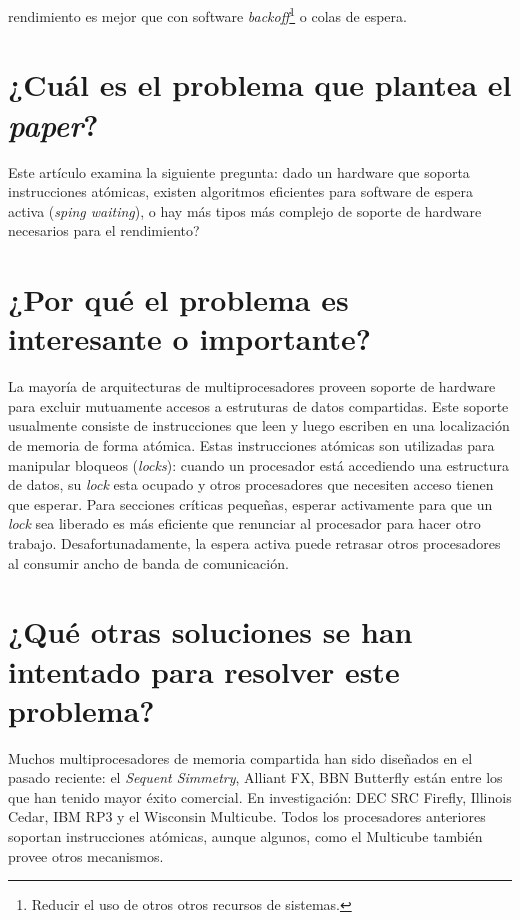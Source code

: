 rendimiento es mejor que con software \textit{backoff}\footnote{Reducir el uso de otros otros recursos de sistemas.} o colas de espera.  

\section{¿Cuál es el problema que plantea el \textit{paper}?}
Este artículo examina la siguiente pregunta: dado un hardware que soporta instrucciones atómicas, existen algoritmos eficientes para software de espera activa (\textit{sping waiting}), o hay más tipos más complejo de soporte de hardware necesarios para el rendimiento? 

\section{¿Por qué el problema es interesante o importante?}
La mayoría de arquitecturas de multiprocesadores proveen soporte de hardware para excluir mutuamente accesos a estruturas de datos compartidas. Este soporte usualmente consiste de instrucciones que leen y luego escriben en una localización de memoria de forma atómica. Estas instrucciones atómicas son utilizadas para manipular bloqueos (\textit{locks}): cuando un procesador está accediendo una estructura de datos, su \textit{lock} esta ocupado y otros procesadores que necesiten acceso tienen que esperar. Para secciones críticas pequeñas, esperar activamente para que un \textit{lock} sea liberado es más eficiente que renunciar al procesador para hacer otro trabajo. Desafortunadamente, la espera activa puede retrasar otros procesadores al consumir ancho de banda de comunicación. 

\section{¿Qué otras soluciones se han intentado para resolver este problema?}
Muchos multiprocesadores de memoria compartida han sido diseñados en el pasado reciente: el \textit{Sequent Simmetry}, Alliant FX, BBN Butterfly están entre los que han tenido mayor éxito comercial. En investigación: DEC SRC Firefly, Illinois Cedar, IBM RP3 y el Wisconsin Multicube. Todos los procesadores anteriores soportan instrucciones atómicas, aunque algunos, como el Multicube también provee otros mecanismos.

     
